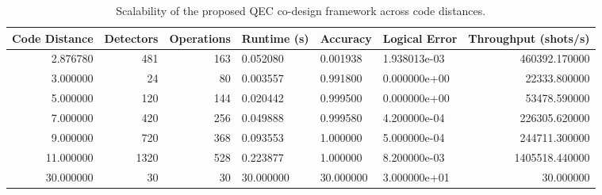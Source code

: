\begin{table}
\caption{Scalability of the proposed QEC co-design framework across code distances.}
\label{tab:scalability}
\begin{tabular}{rrrlllr}
\toprule
Code Distance & Detectors & Operations & Runtime (s) & Accuracy & Logical Error & Throughput (shots/s) \\
\midrule
2.876780 & 481 & 163 & 0.052080 & 0.001938 & 1.938013e-03 & 460392.170000 \\
3.000000 & 24 & 80 & 0.003557 & 0.991800 & 0.000000e+00 & 22333.800000 \\
5.000000 & 120 & 144 & 0.020442 & 0.999500 & 0.000000e+00 & 53478.590000 \\
7.000000 & 420 & 256 & 0.049888 & 0.999580 & 4.200000e-04 & 226305.620000 \\
9.000000 & 720 & 368 & 0.093553 & 1.000000 & 5.000000e-04 & 244711.300000 \\
11.000000 & 1320 & 528 & 0.223877 & 1.000000 & 8.200000e-03 & 1405518.440000 \\
30.000000 & 30 & 30 & 30.000000 & 30.000000 & 3.000000e+01 & 30.000000 \\
\bottomrule
\end{tabular}
\end{table}
